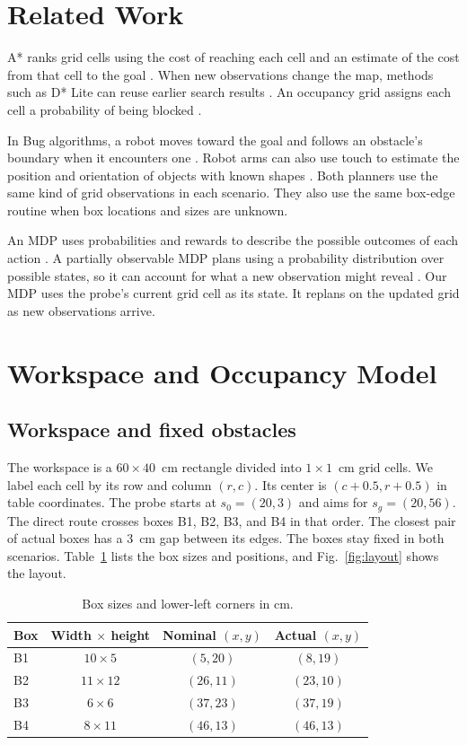\documentclass[letterpaper,journal]{IEEEtran}
\begin{document}
\section{Related Work}

A* ranks grid cells using the cost of reaching each cell and an estimate of the cost from that cell to the goal \cite{hart}. When new observations change the map, methods such as D* Lite can reuse earlier search results \cite{koenig2002dstar}. An occupancy grid assigns each cell a probability of being blocked \cite{elfes1989occupancy,thrun}.

In Bug algorithms, a robot moves toward the goal and follows an obstacle's boundary when it encounters one \cite{lumelsky1987path}. Robot arms can also use touch to estimate the position and orientation of objects with known shapes \cite{petrovskaya2011touch}. Both planners use the same kind of grid observations in each scenario. They also use the same box-edge routine when box locations and sizes are unknown.

An MDP uses probabilities and rewards to describe the possible outcomes of each action \cite{puterman}. A partially observable MDP plans using a probability distribution over possible states, so it can account for what a new observation might reveal \cite{kaelbling1998pomdp}. Our MDP uses the probe's current grid cell as its state. It replans on the updated grid as new observations arrive.

\section{Workspace and Occupancy Model}

\subsection{Workspace and fixed obstacles}

The workspace is a $60\times40$~cm rectangle divided into $1\times1$~cm grid cells. We label each cell by its row and column $(r,c)$. Its center is $(c+0.5,r+0.5)$ in table coordinates. The probe starts at $s_0=(20,3)$ and aims for $s_g=(20,56)$. The direct route crosses boxes B1, B2, B3, and B4 in that order. The closest pair of actual boxes has a 3~cm gap between its edges. The boxes stay fixed in both scenarios. Table~\ref{tab:layout} lists the box sizes and positions, and Fig.~\ref{fig:layout} shows the layout.

\begin{table}[t]
\centering
\caption{Box sizes and lower-left corners in cm.}
\label{tab:layout}
\begin{tabular}{@{}lccc@{}}
\toprule
Box & Width $\times$ height & Nominal $(x,y)$ & Actual $(x,y)$\\
\midrule
B1 & $10\times5$ & $(5,20)$ & $(8,19)$\\
B2 & $11\times12$ & $(26,11)$ & $(23,10)$\\
B3 & $6\times6$ & $(37,23)$ & $(37,19)$\\
B4 & $8\times11$ & $(46,13)$ & $(46,13)$\\
\bottomrule
\end{tabular}
\end{table}
\end{document}
